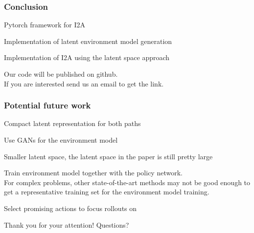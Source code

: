 \begin{frame}
	\frametitle{Conclusion}
	\begin{PraesentationAufzaehlung}
		\item Pytorch framework for I2A
		\item Implementation of latent environment model generation
		\item Implementation of I2A using the latent space approach
	\end{PraesentationAufzaehlung}
	
	\bigskip
	Our code will be published on github.\\
	If you are interested send us an email to get the link.
\end{frame}


\begin{frame}
	\frametitle{Potential future work}
	\begin{PraesentationAufzaehlung}
		\item Compact latent representation for both paths
	\item Use GANs for the environment model
	\item Smaller latent space, the latent space in the paper is still pretty large
	
	\item Train environment model together with the policy network.\\
	For complex problems, other state-of-the-art methods may not be good enough to get a representative training set for the environment model training.
	\item Select promising actions to focus rollouts on
	\end{PraesentationAufzaehlung}
\end{frame}


\begin{frame}
	\vspace*{\fill}
	\huge
	\begingroup
	\centering
	Thank you for your attention!
	\endgroup
	\bigskip
	\begingroup
	\centering
	Questions?
	\endgroup
	\normalsize
	\vspace*{\fill}
\end{frame}
